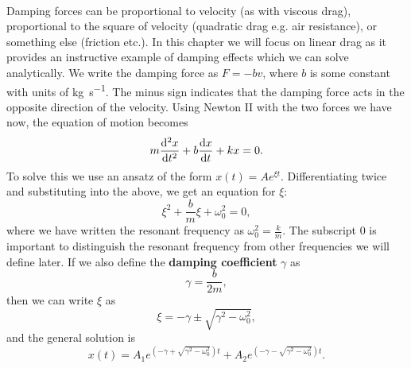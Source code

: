 \documentclass[../classical_mechanics.tex]{subfiles}
\begin{document}
        \paragraph{}
        Damping forces can be proportional to velocity (as with viscous drag), proportional to the square of velocity (quadratic drag e.g. air resistance), or something else (friction etc.).
        In this chapter we will focus on linear drag as it provides an instructive example of damping effects which we can solve analytically.
        We write the damping force as $F=-bv$, where $b$ is some constant with units of \unit{\kilogram\per\second}.
        The minus sign indicates that the damping force acts in the opposite direction of the velocity.
        Using Newton II with the two forces we have now, the equation of motion becomes
        \begin{equation}
            m\dv[2]{x}{t}+b\dv{x}{t}+kx=0.
        \end{equation}
        To solve this we use an ansatz of the form $x(t)=Ae^{\xi t}$.
        Differentiating twice and substituting into the above, we get an equation for $\xi$:
        \begin{equation}
            \xi^2+\frac{b}{m}\xi+\omega_0^2=0,
        \end{equation}
        where we have written the resonant frequency as $\omega_0^2=\frac{k}{m}$.
        The subscript 0 is important to distinguish the resonant frequency from other frequencies we will define later.
        If we also define the \textbf{damping coefficient} $\gamma$ as
        \begin{equation}
            \gamma=\frac{b}{2m},
        \end{equation}
        then we can write $\xi$ as
        \begin{equation}
            \xi=-\gamma\pm\sqrt{\gamma^2-\omega_0^2},
        \end{equation}
        and the general solution is
        \begin{equation}
            x(t)=A_1e^{(-\gamma+\sqrt{\gamma^2-\omega_0^2})t}+A_2e^{(-\gamma-\sqrt{\gamma^2-\omega_0^2})t}.
        \end{equation}
\end{document}
